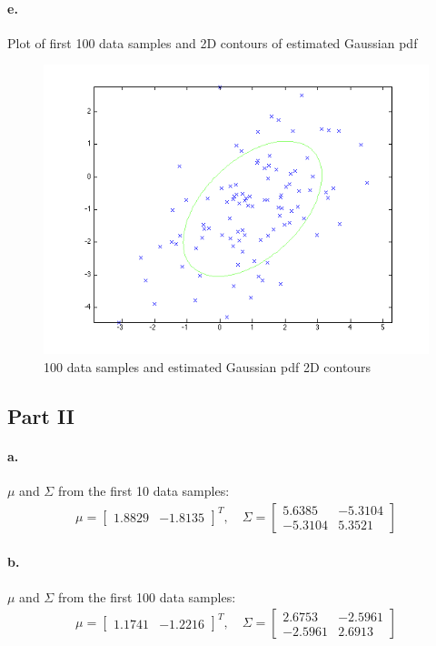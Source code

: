 \documentclass[a4paper]{article}
\begin{document}
\paragraph{e.} Plot of first 100 data samples and 2D contours of estimated Gaussian pdf \\
\begin{figure}[H]
  \centering
    \includegraphics[scale=.44]{images/3_f_I.png}
  \caption{100 data samples and estimated Gaussian pdf 2D contours}
\end{figure}

\subsection*{Part II}

\paragraph{a.} $\mu$ and $\Sigma$ from the first 10 data samples: \\
\begin{align*}
	\mu = \begin{bmatrix}
		1.8829 & -1.8135
	\end{bmatrix}^{T}, \quad
	\Sigma = \begin{bmatrix}
		 5.6385  & -5.3104 \\
		-5.3104  &  5.3521
	\end{bmatrix}
\end{align*}

\paragraph{b.} $\mu$ and $\Sigma$ from the first 100 data samples: \\
\begin{align*}
	\mu = \begin{bmatrix}
		1.1741 & -1.2216
	\end{bmatrix}^{T}, \quad
	\Sigma = \begin{bmatrix}
		 2.6753  & -2.5961 \\
		-2.5961  &  2.6913
	\end{bmatrix}
\end{align*}
\end{document}
